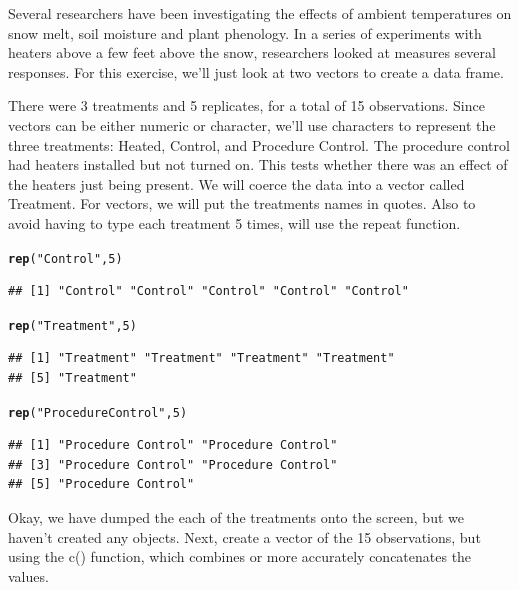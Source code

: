 \documentclass{tufte-handout}\usepackage[]{graphicx}\usepackage[]{color}
\makeatletter
\newcommand{\hlnum}[1]{\textcolor[rgb]{0.686,0.059,0.569}{#1}}%
\newcommand{\hlstr}[1]{\textcolor[rgb]{0.192,0.494,0.8}{#1}}%
\newcommand{\hlstd}[1]{\textcolor[rgb]{0.345,0.345,0.345}{#1}}%
\newcommand{\hlkwd}[1]{\textcolor[rgb]{0.737,0.353,0.396}{\textbf{#1}}}%
\newenvironment{kframe}{%
 \def\at@end@of@kframe{}%
 \ifinner\ifhmode%
  \def\at@end@of@kframe{\end{minipage}}%
  \begin{minipage}{\columnwidth}%
 \fi\fi%
 \def\FrameCommand##1{\hskip\@totalleftmargin \hskip-\fboxsep
 \colorbox{shadecolor}{##1}\hskip-\fboxsep
     \hskip-\linewidth \hskip-\@totalleftmargin \hskip\columnwidth}%
 \MakeFramed {\advance\hsize-\width
   \@totalleftmargin\z@ \linewidth\hsize
   \@setminipage}}%
 {\par\unskip\endMakeFramed%
 \at@end@of@kframe}
\newenvironment{knitrout}{}{} %
\makeatother
\begin{document}
Several researchers have been investigating the effects of ambient temperatures on snow melt, soil moisture and plant phenology. In a series of experiments with heaters above a few feet above the snow, researchers looked at measures several responses. For this exercise, we'll just look at two vectors to create a data frame.

There were 3 treatments and 5 replicates, for a total of 15 observations. Since vectors can be either numeric or character, we'll use characters to represent the three treatments: Heated, Control, and Procedure Control. The procedure control had heaters installed but not turned on. This tests whether there was an effect of the heaters just being present. We will coerce the data into a vector called Treatment.
For vectors, we will put the treatments names in quotes. Also to avoid having to type each treatment 5 times, will use the repeat function.


\begin{knitrout}
\color{fgcolor}\begin{kframe}
\begin{alltt}
\hlkwd{rep}\hlstd{(}\hlstr{"Control"}\hlstd{,} \hlnum{5}\hlstd{)}
\end{alltt}
\begin{verbatim}
## [1] "Control" "Control" "Control" "Control" "Control"
\end{verbatim}
\begin{alltt}
\hlkwd{rep}\hlstd{(}\hlstr{"Treatment"}\hlstd{,} \hlnum{5}\hlstd{)}
\end{alltt}
\begin{verbatim}
## [1] "Treatment" "Treatment" "Treatment" "Treatment"
## [5] "Treatment"
\end{verbatim}
\begin{alltt}
\hlkwd{rep}\hlstd{(}\hlstr{"Procedure Control"}\hlstd{,} \hlnum{5}\hlstd{)}
\end{alltt}
\begin{verbatim}
## [1] "Procedure Control" "Procedure Control"
## [3] "Procedure Control" "Procedure Control"
## [5] "Procedure Control"
\end{verbatim}
\end{kframe}
\end{knitrout}


Okay, we have dumped the each of the treatments onto the screen, but we haven't created any objects. Next, create a vector of the 15 observations, but using the c() function, which combines or more accurately concatenates the values. 
\end{document}
